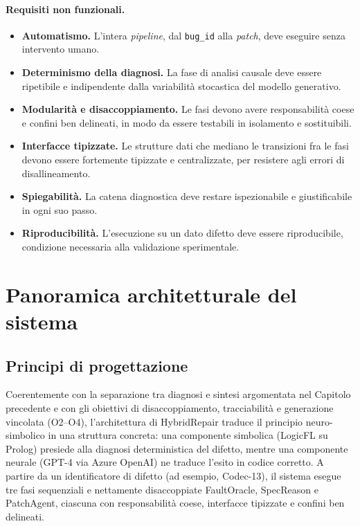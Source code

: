 \paragraph{Requisiti non funzionali.}
\begin{itemize}
    \item[\textbf{RNF1}] \textbf{Automatismo.} L'intera \textit{pipeline}, dal \texttt{bug\_id} alla
    \textit{patch}, deve eseguire senza intervento umano.
    \item[\textbf{RNF2}] \textbf{Determinismo della diagnosi.} La fase di analisi causale deve essere
    ripetibile e indipendente dalla variabilità stocastica del modello generativo.
    \item[\textbf{RNF3}] \textbf{Modularità e disaccoppiamento.} Le fasi devono avere responsabilità
    coese e confini ben delineati, in modo da essere testabili in isolamento e sostituibili.
    \item[\textbf{RNF4}] \textbf{Interfacce tipizzate.} Le strutture dati che mediano le transizioni
    fra le fasi devono essere fortemente tipizzate e centralizzate, per resistere agli errori di
    disallineamento.
    \item[\textbf{RNF5}] \textbf{Spiegabilità.} La catena diagnostica deve restare ispezionabile e
    giustificabile in ogni suo passo.
    \item[\textbf{RNF6}] \textbf{Riproducibilità.} L'esecuzione su un dato difetto deve essere
    riproducibile, condizione necessaria alla validazione sperimentale.
\end{itemize}


\section{Panoramica architetturale del sistema}
\label{sec:panoramica_architetturale}
\subsection{Principi di progettazione}
Coerentemente con la separazione tra diagnosi e sintesi argomentata nel Capitolo precedente e con gli
obiettivi di disaccoppiamento, tracciabilità e generazione vincolata (O2--O4), l'architettura di
HybridRepair traduce il principio neuro-simbolico in una struttura concreta: una componente simbolica
(LogicFL su Prolog) presiede alla diagnosi deterministica del difetto, mentre una componente neurale
(GPT-4 via Azure OpenAI) ne traduce l'esito in codice corretto. A partire da un identificatore di difetto
(ad esempio, Codec-13), il sistema esegue tre fasi sequenziali e nettamente disaccoppiate FaultOracle,
SpecReason e PatchAgent, ciascuna con responsabilità coese, interfacce tipizzate e confini ben
delineati.


